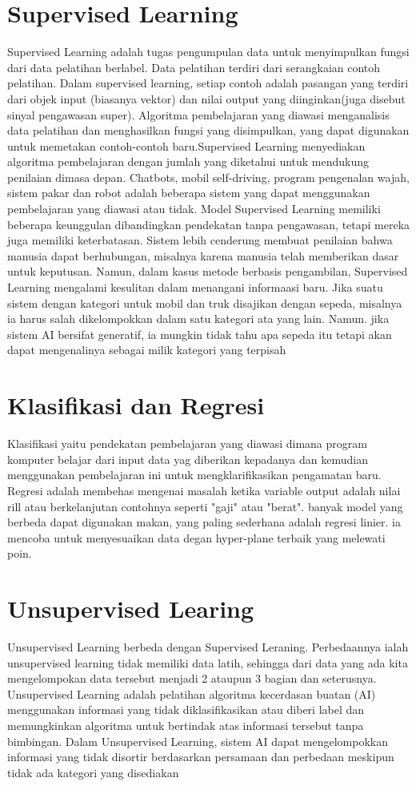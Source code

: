 \section{Supervised Learning}
Supervised Learning adalah tugas pengumpulan data untuk menyimpulkan fungsi dari data pelatihan berlabel. Data pelatihan terdiri dari serangkaian contoh pelatihan. Dalam supervised learning, setiap contoh adalah pasangan yang terdiri dari objek input (biasanya vektor) dan nilai output yang diinginkan(juga disebut sinyal pengawasan super). Algoritma pembelajaran yang diawasi menganalisis data pelatihan dan menghasilkan fungsi yang disimpulkan, yang dapat digunakan untuk memetakan contoh-contoh baru.Supervised Learning menyediakan algoritma pembelajaran dengan jumlah yang diketahui untuk mendukung penilaian dimasa depan. Chatbots, mobil self-driving, program pengenalan wajah, sistem pakar dan robot adalah beberapa sistem yang dapat menggunakan pembelajaran yang diawasi atau tidak. Model Supervised Learning memiliki beberapa keunggulan dibandingkan pendekatan tanpa pengawasan, tetapi mereka juga memiliki keterbatasan. Sistem lebih cenderung membuat penilaian bahwa manusia dapat berhubungan, misalnya karena manusia telah memberikan dasar untuk keputusan. Namun, dalam kasus metode berbasis pengambilan, Supervised Learning mengalami kesulitan dalam menangani informaasi baru. Jika suatu sistem dengan kategori untuk mobil dan truk disajikan dengan sepeda, misalnya ia harus salah dikelompokkan dalam satu kategori ata yang lain. Namun. jika sistem AI bersifat generatif, ia mungkin tidak tahu apa sepeda itu tetapi akan dapat mengenalinya sebagai milik kategori yang terpisah

\section{Klasifikasi dan Regresi}
Klasifikasi yaitu pendekatan pembelajaran yang diawasi dimana program komputer belajar dari input data yag diberikan  kepadanya dan kemudian menggunakan pembelajaran ini untuk mengklarifikasikan pengamatan baru. Regresi adalah membehas mengenai masalah ketika variable output adalah nilai rill atau berkelanjutan contohnya seperti "gaji" atau "berat". banyak model yang berbeda dapat digunakan makan, yang paling sederhana adalah regresi linier. ia mencoba untuk menyesuaikan data degan hyper-plane terbaik yang melewati poin.

\section{Unsupervised Learing}
Unsupervised Learning berbeda dengan Supervised Leraning. Perbedaannya ialah unsupervised learning tidak memiliki data latih, sehingga dari data yang ada kita mengelompokan data tersebut menjadi 2 ataupun 3 bagian dan seterusnya. Unsupervised Learning adalah pelatihan algoritma kecerdasan buatan (AI) menggunakan informasi yang tidak diklasifikasikan atau diberi label dan memungkinkan algoritma untuk bertindak atas informasi tersebut tanpa bimbingan.
Dalam Unsupervised Learning, sistem AI dapat mengelompokkan informasi yang tidak disortir berdasarkan persamaan dan perbedaan meskipun tidak ada kategori yang disediakan

